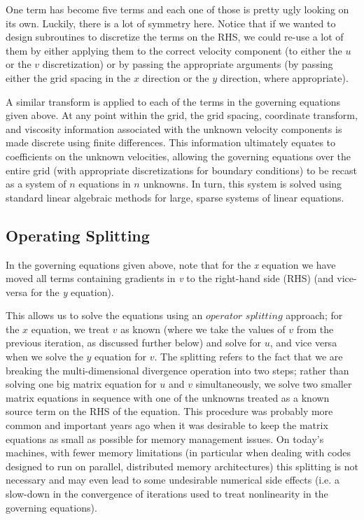 One term has become five terms and each one of those is pretty ugly looking on its own. Luckily, there is a lot of symmetry here. Notice that if we wanted to design subroutines to discretize the terms on the RHS, we could re-use a lot of them by either applying them to the correct velocity component (to either the $u$ or the $v$ discretization) or by passing the appropriate arguments (by passing either the grid spacing in the $x$ direction or the $y$ direction, where appropriate).

A similar transform is applied to each of the terms in the governing equations given above. At any point within the grid, the grid spacing, coordinate transform, and viscosity information associated with the unknown velocity components is made discrete using finite differences. This information ultimately equates to coefficients on the unknown velocities, allowing the governing equations over the entire grid (with appropriate discretizations for boundary conditions) to be recast as a system of $n$ equations in $n$ unknowns. In turn, this system is solved using standard linear algebraic methods for large, sparse systems of linear equations.

\subsection{Operating Splitting}
In the governing equations given above, note that for the \textit{x} equation we have moved all terms containing gradients in \textit{v} to the right-hand side (RHS) (and vice-versa for the \textit{y} equation). 

This allows us to solve the equations using an $operator$ $splitting$ approach; for the $x$ equation, we treat $v$ as known (where we take the values of $v$ from the previous iteration, as discussed further below) and solve for $u$, and vice versa when we solve the $y$ equation for $v$. The splitting refers to the fact that we are breaking the multi-dimensional divergence operation into two steps; rather than solving one big matrix equation for $u$ and $v$ simultaneously, we solve two smaller matrix equations in sequence with one of the unknowns treated as a known source term on the RHS of the equation. This procedure was probably more common and important years ago when it was desirable to keep the matrix equations as small as possible for memory management issues. On today's machines, with fewer memory limitations (in particular when dealing with codes designed to run on parallel, distributed memory architectures) this splitting is not necessary and may even lead to some undesirable numerical side effects (i.e. a slow-down in the convergence of iterations used to treat nonlinearity in the governing equations).

